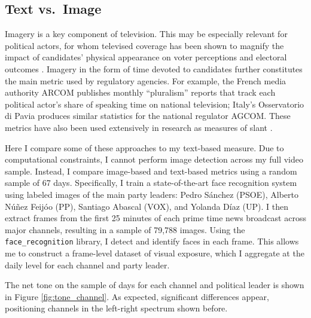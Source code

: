 \documentclass[12pt]{article}
\begin{document}
\subsection{Text vs.\ Image}




Imagery is a key component of television. This may be especially relevant for political actors, for whom televised coverage has been shown to magnify the impact of candidates’ physical appearance on voter perceptions and electoral outcomes \citep{Lenz2011LookingTP}. Imagery in the form of time devoted to candidates further constitutes the main metric used by regulatory agencies. For example, the French media authority ARCOM publishes monthly “pluralism” reports that track each political actor’s share of speaking time on national television; Italy’s Osservatorio di Pavia produces similar statistics for the national regulator AGCOM. These metrics have also been used extensively in research as measures of slant \citep[see, e.g.,][]{CageHengelHerveUrvoy2022,durante2012partisan}.

Here I compare some of these approaches to my text-based measure. Due to computational constraints, I cannot perform image detection across my full video sample. Instead, I compare image-based and text-based metrics using a random sample of 67 days. Specifically, I train a state-of-the-art face recognition system \citep{face_recognition} using labeled images of the main party leaders: Pedro Sánchez (PSOE), Alberto Núñez Feijóo (PP), Santiago Abascal (VOX), and Yolanda Díaz (UP). I then extract frames from the first 25 minutes of each prime time news broadcast across major channels, resulting in a sample of 79,788 images. Using the \texttt{face\_recognition} library, I detect and identify faces in each frame. This allows me to construct a frame-level dataset of visual exposure, which I aggregate at the daily level for each channel and party leader.

The net tone on the sample of days for each channel and political leader is shown in Figure 	\ref{fig:tone_channel}. As expected, significant differences appear, positioning channels in the left-right spectrum shown before. 
\end{document}
